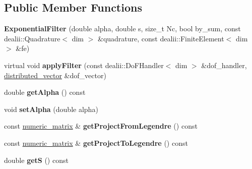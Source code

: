 \subsection*{Public Member Functions}
\begin{DoxyCompactItemize}
\item 
\hypertarget{classnatrium_1_1ExponentialFilter_ada6ba85b86d82f7a5778ffeb6eb493a0}{
{\bfseries ExponentialFilter} (double alpha, double s, size\_\-t Nc, bool by\_\-sum, const dealii::Quadrature$<$ dim $>$ \&quadrature, const dealii::FiniteElement$<$ dim $>$ \&fe)}
\label{classnatrium_1_1ExponentialFilter_ada6ba85b86d82f7a5778ffeb6eb493a0}

\item 
\hypertarget{classnatrium_1_1ExponentialFilter_accc2cb39244329cf08fd9a8ce6f4967d}{
virtual void {\bfseries applyFilter} (const dealii::DoFHandler$<$ dim $>$ \&dof\_\-handler, \hyperlink{namespacenatrium_a903d2b92917f582f2ff05f52160ab811}{distributed\_\-vector} \&dof\_\-vector)}
\label{classnatrium_1_1ExponentialFilter_accc2cb39244329cf08fd9a8ce6f4967d}

\item 
\hypertarget{classnatrium_1_1ExponentialFilter_a4916e533bd21556c111cadb41a62150d}{
double {\bfseries getAlpha} () const }
\label{classnatrium_1_1ExponentialFilter_a4916e533bd21556c111cadb41a62150d}

\item 
\hypertarget{classnatrium_1_1ExponentialFilter_ae3da30faa73264b0b4b77eaf1f997a76}{
void {\bfseries setAlpha} (double alpha)}
\label{classnatrium_1_1ExponentialFilter_ae3da30faa73264b0b4b77eaf1f997a76}

\item 
\hypertarget{classnatrium_1_1ExponentialFilter_a728ae9decf2609a692177c4236d3efbc}{
const \hyperlink{namespacenatrium_ad8cbec7aab93a74837b06ded39615d47}{numeric\_\-matrix} \& {\bfseries getProjectFromLegendre} () const }
\label{classnatrium_1_1ExponentialFilter_a728ae9decf2609a692177c4236d3efbc}

\item 
\hypertarget{classnatrium_1_1ExponentialFilter_a575257170aeddb2b18287e54c6a9d39d}{
const \hyperlink{namespacenatrium_ad8cbec7aab93a74837b06ded39615d47}{numeric\_\-matrix} \& {\bfseries getProjectToLegendre} () const }
\label{classnatrium_1_1ExponentialFilter_a575257170aeddb2b18287e54c6a9d39d}

\item 
\hypertarget{classnatrium_1_1ExponentialFilter_a9f275d8ce24b68f8a9bf99256e5ef3ba}{
double {\bfseries getS} () const }
\label{classnatrium_1_1ExponentialFilter_a9f275d8ce24b68f8a9bf99256e5ef3ba}


\end{DoxyCompactItemize}
